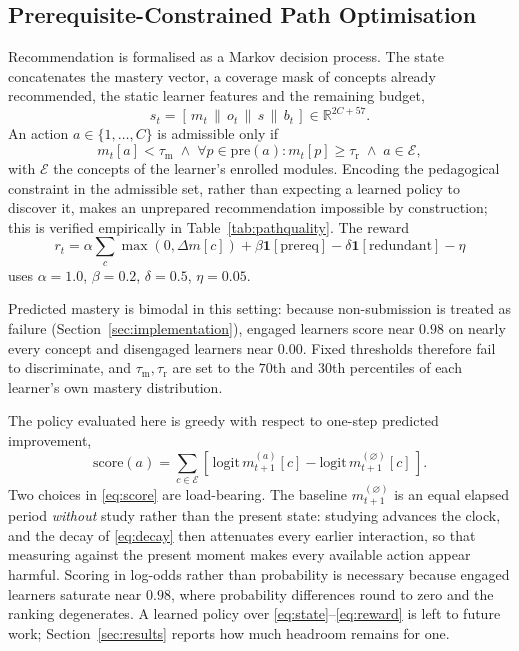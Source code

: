 \documentclass[conference]{IEEEtran}
\begin{document}
\subsection{Prerequisite-Constrained Path Optimisation}

Recommendation is formalised as a Markov decision process. The state concatenates the
mastery vector, a coverage mask of concepts already recommended, the static learner
features and the remaining budget,
%
\begin{equation}
s_t = [\, m_t \,\|\, o_t \,\|\, s \,\|\, b_t \,] \in \mathbb{R}^{2C + 57}.
\label{eq:state}
\end{equation}
%
An action $a \in \{1, \dots, C\}$ is admissible only if
%
\begin{equation}
m_t[a] < \tau_{\mathrm{m}} \;\wedge\; \forall p \in \mathrm{pre}(a): m_t[p] \geq \tau_{\mathrm{r}} \;\wedge\; a \in \mathcal{E},
\label{eq:mask}
\end{equation}
%
with $\mathcal{E}$ the concepts of the learner's enrolled modules. Encoding the
pedagogical constraint in the admissible set, rather than expecting a learned policy to
discover it, makes an unprepared recommendation impossible by construction; this is
verified empirically in Table~\ref{tab:pathquality}. The reward
%
\begin{equation}
r_t = \alpha \sum_c \max(0, \Delta m[c]) + \beta \mathbf{1}[\mathrm{prereq}] - \delta \mathbf{1}[\mathrm{redundant}] - \eta
\label{eq:reward}
\end{equation}
%
uses $\alpha = 1.0$, $\beta = 0.2$, $\delta = 0.5$, $\eta = 0.05$.

Predicted mastery is bimodal in this setting: because non-submission is treated as
failure (Section~\ref{sec:implementation}), engaged learners score near $0.98$ on nearly
every concept and disengaged learners near $0.00$. Fixed thresholds therefore fail to
discriminate, and $\tau_{\mathrm{m}}, \tau_{\mathrm{r}}$ are set to the $70$th and $30$th
percentiles of each learner's own mastery distribution.

The policy evaluated here is greedy with respect to one-step predicted improvement,
%
\begin{equation}
\mathrm{score}(a) = \sum_{c \in \mathcal{E}} \left[\, \mathrm{logit}\, m^{(a)}_{t+1}[c] - \mathrm{logit}\, m^{(\varnothing)}_{t+1}[c] \,\right].
\label{eq:score}
\end{equation}
%
Two choices in \eqref{eq:score} are load-bearing. The baseline $m^{(\varnothing)}_{t+1}$
is an equal elapsed period \emph{without} study rather than the present state: studying
advances the clock, and the decay of \eqref{eq:decay} then attenuates every earlier
interaction, so that measuring against the present moment makes every available action
appear harmful. Scoring in log-odds rather than probability is necessary because engaged
learners saturate near $0.98$, where probability differences round to zero and the
ranking degenerates. A learned policy over \eqref{eq:state}--\eqref{eq:reward} is left to
future work; Section~\ref{sec:results} reports how much headroom remains for one.
\end{document}
